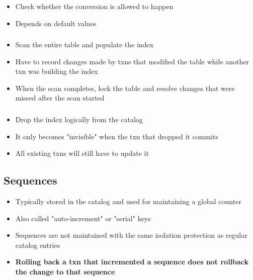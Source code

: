 \documentclass[11pt]{article}
\begin{document}
        \subsubsection*{}
        \begin{itemize}
            \item Check whether the conversion is allowed to happen
            \item Depends on default values
        \end{itemize}
        \subsubsection*{}
        \begin{itemize}
            \item Scan the entire table and populate the index
            \item Have to record changes made by txns that modified the table while another txn was building the index
            \item When the scan completes, lock the table and resolve changes that were missed after the scan started
        \end{itemize}
        \subsubsection*{}
        \begin{itemize}
            \item Drop the index logically from the catalog
            \item It only becomes "invisible" when the txn that dropped it commits
            \item All existing txns will still have to update it
        \end{itemize}

    \subsection*{Sequences}
    \begin{itemize}
        \item Typically stored in the catalog and used for maintaining a global counter
        \item Also called "auto-increment" or "serial" keys
        \item Sequences are not maintained with the same isolation protection as regular catalog entries
        \item \textbf{Rolling back a txn that incremented a sequence does not rollback the change to that sequence}
    \end{itemize}
\end{document}

